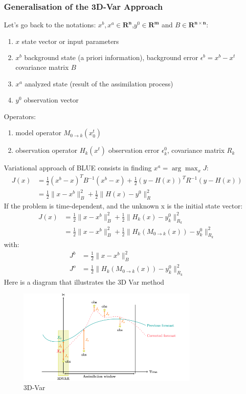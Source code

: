 \subsubsection{Generalisation of the 3D-Var Approach}
\noindent Let's go back to the notations:
\noindent  $x^b ,x^a\in \mathbf{R^n}$,$y^0 \in \mathbf{R^m} $ and $B \in \mathbf{R^{n\times n}}$:
 \begin{enumerate}[label=\textbullet]
		\item $x$ state vector or input parameters
		\item $x^{b}$ background state (a priori information), background  error $\epsilon^b=x^b-x^t$ covariance matrix $B$
		\item $x^{a}$ analyzed state (result of the assimilation process)
		\item $y^0$ observation vector
	\end{enumerate}
\noindent Operators:
    \begin{enumerate}[label=\textbullet]
		\item model operator $M_{0 \rightarrow k}(x_0^t)$
		\item observation operator $H_k(x^t)$ observation error $\epsilon_k^0$, covariance matrix $R_k$
	\end{enumerate}
\noindent Variational approach of BLUE consists in finding $x^a=\arg\max_{x}J$:
$$\begin{aligned}
J(x)&=\frac{1}{2}(x^b-x)^TB^{-1}(x^b-x)+\frac{1}{2}(y-H(x))^TR^{-1}(y-H(x)) \\
&=\frac{1}{2}\|x-x^b\|_B^2+\frac{1}{2}\|H(x)-y^0\|_R^2
\end{aligned}$$
If the problem is time-dependent, and the unknown x is the initial state vector:
$$\begin{aligned}
J(x)&=\frac{1}{2}\|x-x^b\|_B^2+\frac{1}{2}\|H_k(x)-y_k^0\|_{R_{k}}^2 \\
&=\frac{1}{2}\|x-x^b\|_B^2+\frac{1}{2}\|H_k(M_{0 \rightarrow k}(x))-y_k^0\|_{R_{k}}^2
\end{aligned}$$
with:
$$\begin{aligned}
J^b&=\frac{1}{2}\|x-x^b\|_B^2\\
J^o&=\frac{1}{2}\|H_k(M_{0 \rightarrow k}(x))-y_k^0\|_{R_{k}}^2
\end{aligned}$$
\vspace*{5mm}
Here is a diagram that illustrates the 3D Var method 
\begin{figure}
    \centering
		\includegraphics[width=0.8\textwidth]{"images/enkf/schema_3D_Var.png"}
		\caption{3D-Var}
\end{figure}
